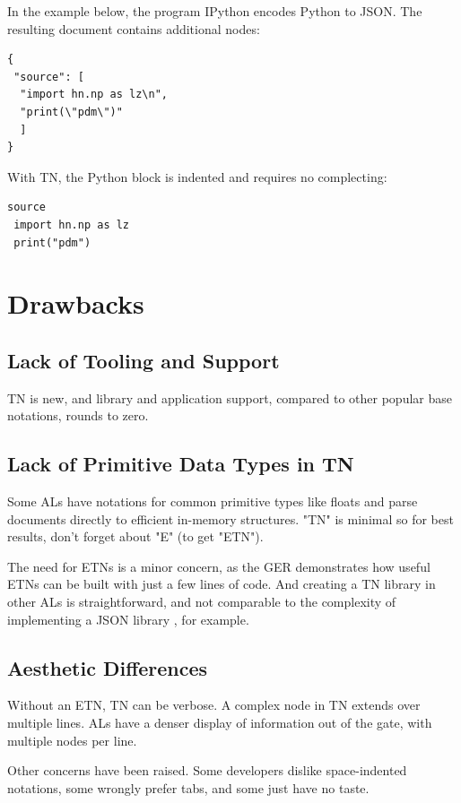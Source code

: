 \documentclass[journal]{IEEEtran}
\begin{document}
In the example below, the program IPython encodes Python to JSON. The resulting document contains additional nodes:

\begin{lstlisting}
{
 "source": [
  "import hn.np as lz\n",
  "print(\"pdm\")"
  ]
}
\end{lstlisting}

With TN, the Python block is indented and requires no complecting:

\begin{lstlisting}
source
 import hn.np as lz
 print("pdm")
\end{lstlisting}

\section{Drawbacks}

\subsection{Lack of Tooling and Support}

TN is new, and library and application support, compared to other popular base notations, rounds to zero.

\subsection{Lack of Primitive Data Types in TN}

Some ALs have notations for common primitive types like floats and parse documents directly to efficient in-memory structures. "TN" is minimal so for best results, don't forget about "E" (to get "ETN").

The need for ETNs is a minor concern, as the GER demonstrates how useful ETNs can be built with just a few lines of code. And creating a TN library in other ALs is straightforward, and not comparable to the complexity of implementing a JSON library \cite{Ooms}, for example.

\subsection{Aesthetic Differences}

Without an ETN, TN can be verbose. A complex node in TN extends over multiple lines. ALs have a denser display of information out of the gate, with multiple nodes per line.

Other concerns have been raised. Some developers dislike space-indented notations, some wrongly prefer tabs, and some just have no taste.
\end{document}

